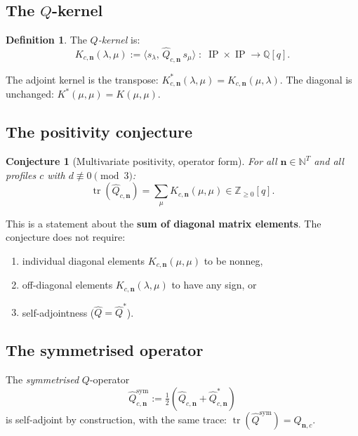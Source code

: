 \documentclass[11pt]{article}
\newcommand{\N}{\mathbb{N}}
\newcommand{\Z}{\mathbb{Z}}
\newcommand{\Q}{\mathbb{Q}}
\newcommand{\IP}{\operatorname{IP}}
\DeclareMathOperator{\tr}{tr}
\theoremstyle{plain}
\newtheorem{conjecture}[theorem]{Conjecture}
\theoremstyle{definition}
\newtheorem{definition}[theorem]{Definition}
\begin{document}
\subsection{The $Q$-kernel}

\begin{definition}
The \emph{$Q$-kernel} is:
\begin{equation}\label{eq:kernel}
  K_{c,\mathbf{n}}(\lambda, \mu)
  := \langle s_\lambda,\, \hat{Q}_{c,\mathbf{n}}\, s_\mu \rangle
  \;\colon\; \IP \times \IP \to \Q[q].
\end{equation}
\end{definition}

The adjoint kernel is the transpose:
$K_{c,\mathbf{n}}^*(\lambda, \mu) = K_{c,\mathbf{n}}(\mu, \lambda)$.
The diagonal is unchanged: $K^*(\mu,\mu) = K(\mu,\mu)$.

\subsection{The positivity conjecture}

\begin{conjecture}[Multivariate positivity, operator form]
\label{conj:positivity}
For all $\mathbf{n} \in \N^T$ and all profiles $c$ with
$d \not\equiv 0 \pmod{3}$:
\begin{equation}\label{eq:positivity}
  \tr(\hat{Q}_{c,\mathbf{n}})
  = \sum_\mu K_{c,\mathbf{n}}(\mu, \mu)
  \in \Z_{\geq 0}[q].
\end{equation}
\end{conjecture}

This is a statement about the \textbf{sum of diagonal matrix
elements}.  The conjecture does not require:
\begin{enumerate}
  \item individual diagonal elements
    $K_{c,\mathbf{n}}(\mu, \mu)$ to be nonneg,
  \item off-diagonal elements
    $K_{c,\mathbf{n}}(\lambda, \mu)$ to have any sign, or
  \item self-adjointness ($\hat{Q} = \hat{Q}^*$).
\end{enumerate}

\subsection{The symmetrised operator}

The \emph{symmetrised} $Q$-operator
\begin{equation}\label{eq:symmetrised}
  \hat{Q}_{c,\mathbf{n}}^{\mathrm{sym}}
  := \tfrac{1}{2}(\hat{Q}_{c,\mathbf{n}}
     + \hat{Q}_{c,\mathbf{n}}^*)
\end{equation}
is self-adjoint by construction, with the same trace:
$\tr(\hat{Q}^{\mathrm{sym}}) = Q_{\mathbf{n},c}$.
\end{document}
